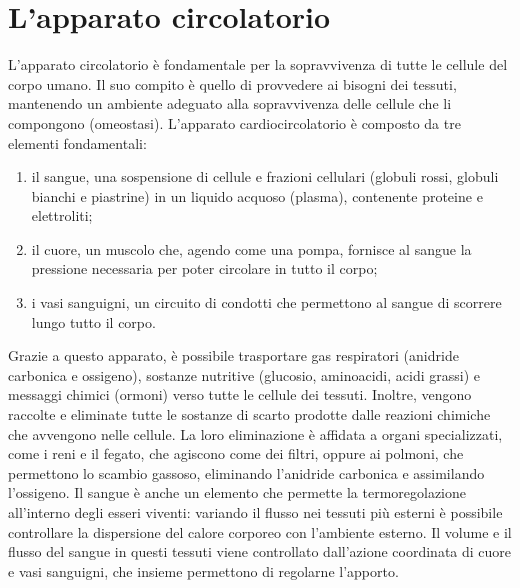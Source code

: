 \section{L'apparato circolatorio}
L'apparato circolatorio è fondamentale per la sopravvivenza di tutte le cellule del corpo umano. Il suo compito è quello di provvedere ai bisogni dei tessuti, mantenendo un ambiente adeguato alla sopravvivenza delle cellule che li compongono (omeostasi)\cite{Cevese2002}. 
L'apparato cardiocircolatorio è composto da tre elementi fondamentali:
\begin{enumerate}
\item il sangue, una sospensione di cellule e frazioni cellulari (globuli rossi, globuli bianchi e piastrine) in un liquido acquoso (plasma), contenente proteine e elettroliti;
\item il cuore, un muscolo che, agendo come una pompa, fornisce al sangue la pressione necessaria per poter circolare in tutto il corpo;
\item i vasi sanguigni, un circuito di condotti che permettono al sangue di scorrere lungo tutto il corpo.
\end{enumerate}
Grazie a questo apparato, è possibile trasportare gas respiratori (anidride carbonica e ossigeno), sostanze nutritive (glucosio, aminoacidi, acidi grassi) e messaggi chimici (ormoni) verso tutte le cellule dei tessuti. Inoltre, vengono raccolte e eliminate tutte le sostanze di scarto prodotte  dalle reazioni chimiche che avvengono nelle cellule. La loro eliminazione è affidata a organi specializzati, come i reni e il fegato, che agiscono come dei filtri, oppure ai polmoni, che permettono lo scambio gassoso, eliminando l'anidride carbonica e assimilando l'ossigeno. Il sangue è anche un elemento che permette la termoregolazione all'interno degli esseri viventi: variando il flusso nei tessuti più esterni è possibile controllare la dispersione del calore corporeo con l'ambiente esterno. Il volume e il flusso del sangue in questi tessuti viene controllato dall'azione coordinata di cuore e vasi sanguigni, che insieme permettono di regolarne l'apporto.

